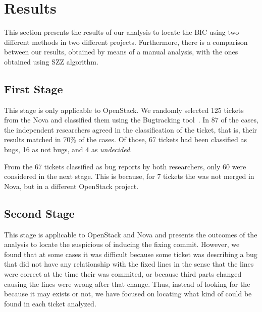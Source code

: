\documentclass[a4paper, 12pt]{book}
\begin{document}


\section{Results}
\label{sec:results}
This section presents the results of our analysis to locate the BIC using two different methods in two different projects. Furthermore, there is a comparison between our results, obtained by means of a manual analysis, with the ones obtained using SZZ algorithm.

\subsection{First Stage}
\label{sec:resultsFS}

This stage is only applicable to OpenStack. We randomly selected 125 tickets from the Nova and classified them using the Bugtracking tool~\cite{rodriguez2016bugtracking}. In 87 of the cases, the independent researchers agreed in the classification of the ticket, that is, their results matched in 70\% of the cases. Of those, 67 tickets had been classified as bugs, 16 as not bugs, and 4 as \emph{undecided}.


From the 67 tickets classified as bug reports by both researchers, only 60 were considered in the next stage. This is because, for 7 tickets the \BFC was not merged in Nova, but in a different OpenStack project.

\subsection{Second Stage}
\label{sec:resultsSS}

This stage is applicable to OpenStack and Nova and presents the outcomes of the analysis to locate the suspicious \BIC of inducing the fixing commit. However, we found that at some cases it was difficult because some ticket was describing a bug that did not have any relationship with the fixed lines in the sense that the lines were correct at the time their was commited, or because third parts changed causing the lines were wrong after that change. Thus, instead of looking for the \BIC because it may exists or not, we have focused on locating what kind of \FFC could be found in each ticket analyzed.
\end{document}
